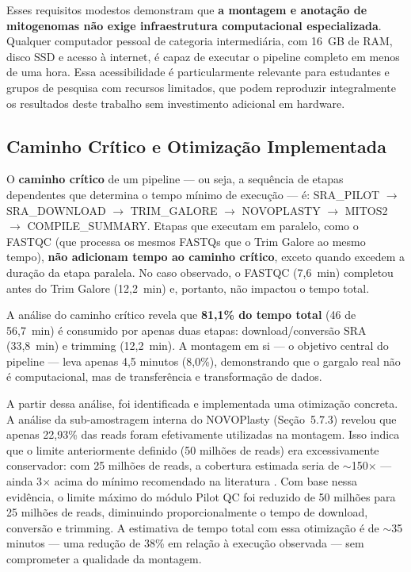 Esses requisitos modestos demonstram que \textbf{a montagem e anotação de mitogenomas não exige infraestrutura computacional especializada}. Qualquer computador pessoal de categoria intermediária, com 16~GB de RAM, disco SSD e acesso à internet, é capaz de executar o pipeline completo em menos de uma hora. Essa acessibilidade é particularmente relevante para estudantes e grupos de pesquisa com recursos limitados, que podem reproduzir integralmente os resultados deste trabalho sem investimento adicional em hardware.

\subsection{Caminho Crítico e Otimização Implementada}

O \textbf{caminho crítico} de um pipeline --- ou seja, a sequência de etapas dependentes que determina o tempo mínimo de execução --- é: SRA\_PILOT $\rightarrow$ SRA\_DOWNLOAD $\rightarrow$ TRIM\_GALORE $\rightarrow$ NOVOPLASTY $\rightarrow$ MITOS2 $\rightarrow$ COMPILE\_SUMMARY. Etapas que executam em paralelo, como o FASTQC (que processa os mesmos FASTQs que o Trim Galore ao mesmo tempo), \textbf{não adicionam tempo ao caminho crítico}, exceto quando excedem a duração da etapa paralela. No caso observado, o FASTQC (7,6~min) completou antes do Trim Galore (12,2~min) e, portanto, não impactou o tempo total.

A análise do caminho crítico revela que \textbf{81,1\% do tempo total} (46 de 56,7~min) é consumido por apenas duas etapas: download/conversão SRA (33,8~min) e trimming (12,2~min). A montagem em si --- o objetivo central do pipeline --- leva apenas 4,5 minutos (8,0\%), demonstrando que o gargalo real não é computacional, mas de transferência e transformação de dados.

A partir dessa análise, foi identificada e implementada uma otimização concreta. A análise da sub-amostragem interna do NOVOPlasty (Seção~5.7.3) revelou que apenas 22,93\% das reads foram efetivamente utilizadas na montagem. Isso indica que o limite anteriormente definido (50 milhões de reads) era excessivamente conservador: com 25 milhões de reads, a cobertura estimada seria de $\sim$150$\times$ --- ainda 3$\times$ acima do mínimo recomendado na literatura \cite{dierckxsens2017}. Com base nessa evidência, o limite máximo do módulo Pilot QC foi reduzido de 50 milhões para 25 milhões de reads, diminuindo proporcionalmente o tempo de download, conversão e trimming. A estimativa de tempo total com essa otimização é de $\sim$35 minutos --- uma redução de 38\% em relação à execução observada --- sem comprometer a qualidade da montagem.

